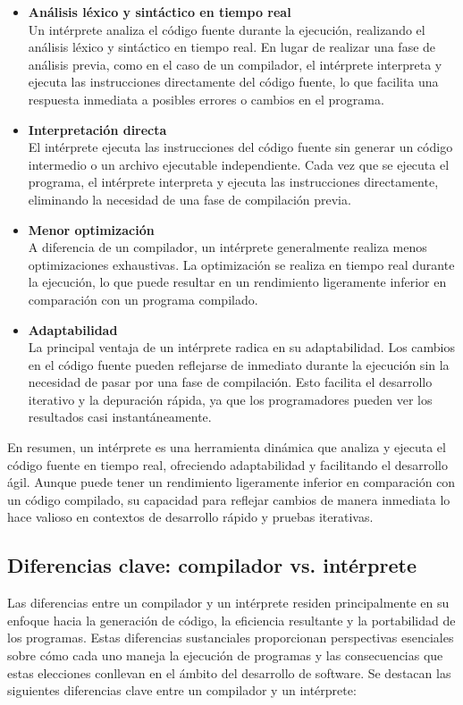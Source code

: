 \begin{itemize}
  \item \textbf{Análisis léxico y sintáctico en tiempo real} \\
  Un intérprete analiza el código fuente durante la ejecución, realizando el análisis léxico y sintáctico en tiempo real. En lugar de realizar una fase de análisis previa, como en el caso de un compilador, el intérprete interpreta y ejecuta las instrucciones directamente del código fuente, lo que facilita una respuesta inmediata a posibles errores o cambios en el programa. \parencite{Jeffery2021}
  \item \textbf{Interpretación directa} \\
  El intérprete ejecuta las instrucciones del código fuente sin generar un código intermedio o un archivo ejecutable independiente. Cada vez que se ejecuta el programa, el intérprete interpreta y ejecuta las instrucciones directamente, eliminando la necesidad de una fase de compilación previa. \parencite{Jeffery2021}
  \item \textbf{Menor optimización} \\
  A diferencia de un compilador, un intérprete generalmente realiza menos optimizaciones exhaustivas. La optimización se realiza en tiempo real durante la ejecución, lo que puede resultar en un rendimiento ligeramente inferior en comparación con un programa compilado. \parencite{Jeffery2021}
  \item \textbf{Adaptabilidad} \\
  La principal ventaja de un intérprete radica en su adaptabilidad. Los cambios en el código fuente pueden reflejarse de inmediato durante la ejecución sin la necesidad de pasar por una fase de compilación. Esto facilita el desarrollo iterativo y la depuración rápida, ya que los programadores pueden ver los resultados casi instantáneamente. \parencite{Jeffery2021}
\end{itemize}

En resumen, un intérprete es una herramienta dinámica que analiza y ejecuta el código fuente en tiempo real, ofreciendo adaptabilidad y facilitando el desarrollo ágil. Aunque puede tener un rendimiento ligeramente inferior en comparación con un código compilado, su capacidad para reflejar cambios de manera inmediata lo hace valioso en contextos de desarrollo rápido y pruebas iterativas.

\subsection{Diferencias clave: compilador vs. intérprete}
Las diferencias entre un compilador y un intérprete residen principalmente en su enfoque hacia la generación de código, la eficiencia resultante y la portabilidad de los programas. Estas diferencias sustanciales proporcionan perspectivas esenciales sobre cómo cada uno maneja la ejecución de programas y las consecuencias que estas elecciones conllevan en el ámbito del desarrollo de software. Se destacan las siguientes diferencias clave entre un compilador y un intérprete:

